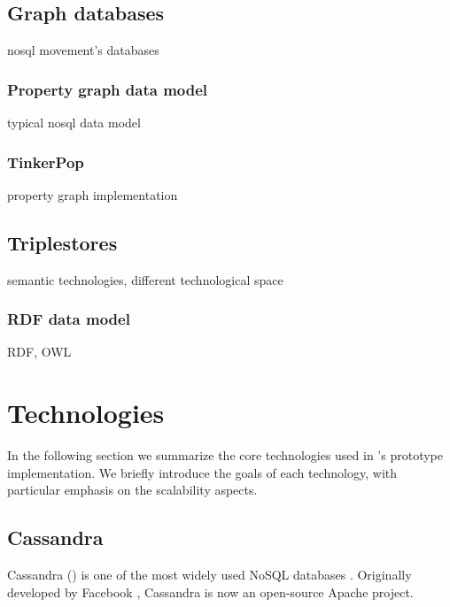
\subsection{Graph databases}

nosql movement's databases

\subsubsection{Property graph data model}

typical nosql data model

\subsubsection{TinkerPop}

property graph implementation

\subsection{Triplestores}

semantic technologies, different technological space

\subsubsection{RDF data model}

RDF, OWL

\section{Technologies}

In the following section we summarize the core technologies used in \iqd's prototype implementation. We briefly introduce the goals of each technology, with particular emphasis on the scalability aspects.

\subsection{Cassandra}

Cassandra () is one of the most widely used NoSQL databases \cite{Cassandra}. Originally developed by Facebook \cite{Lakshman:2010:CDS:1773912.1773922}, Cassandra is now an open-source Apache project.

